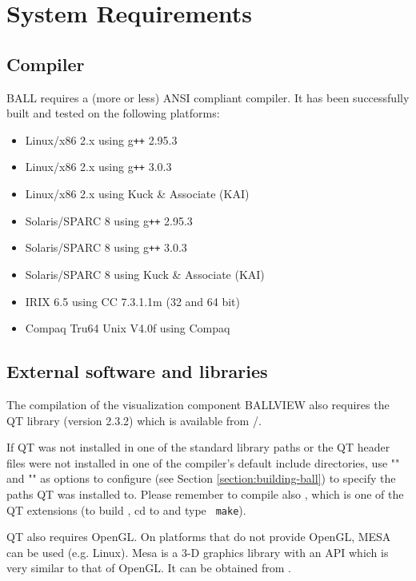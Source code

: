 \section{System Requirements}

\subsection{Compiler}
  BALL requires a (more or less) ANSI compliant \CPP compiler.
  It has been successfully built and tested on the following platforms:
	\begin{itemize}	
   	\item Linux/x86 2.x using g{\tt ++} 2.95.3
   	\item Linux/x86 2.x using g{\tt ++} 3.0.3
   	\item Linux/x86 2.x using Kuck \& Associate (KAI) 
   	\item Solaris/SPARC 8 using g{\tt ++} 2.95.3
   	\item Solaris/SPARC 8 using g{\tt ++} 3.0.3
   	\item Solaris/SPARC 8 using Kuck \& Associate (KAI) 
   	\item IRIX 6.5 using CC 7.3.1.1m (32 and 64 bit)
   	\item Compaq Tru64 Unix V4.0f using Compaq 
 	\end{itemize}

\subsection{External software and libraries}
The compilation of the visualization component BALLVIEW also requires
the QT library (version 2.3.2) which is available from
/.

If QT was not installed in one of the standard library paths or the
QT header files were not installed in one of the compiler's default
include directories, use \mbox{""} and
\mbox{""} as
options to configure (see Section \ref{section:building-ball}) to specify the paths
QT was installed to.
Please remember to compile also , which is one of the QT extensions
(to build , cd to {\tt{}} and type {\tt
make}).

QT also requires OpenGL. On platforms that do not provide OpenGL, MESA can
be used (e.g. Linux). Mesa is a 3-D graphics library with an API which is 
very similar to that of OpenGL. It can be obtained from .

